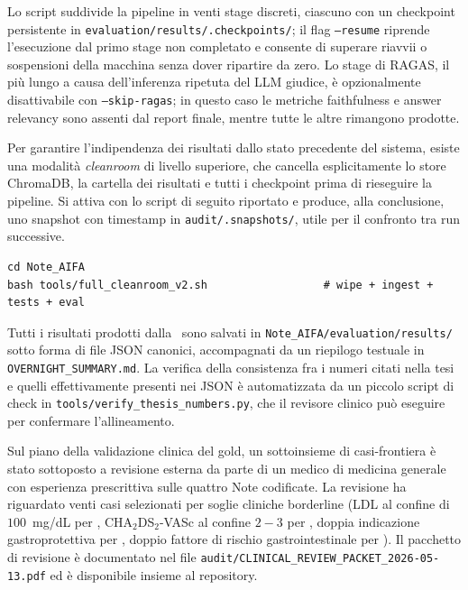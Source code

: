 Lo script suddivide la pipeline in venti stage discreti, ciascuno con un checkpoint persistente in \texttt{evaluation/results/.checkpoints/}; il flag \texttt{--resume} riprende l'esecuzione dal primo stage non completato e consente di superare riavvii o sospensioni della macchina senza dover ripartire da zero. Lo stage di RAGAS, il più lungo a causa dell'inferenza ripetuta del LLM giudice, è opzionalmente disattivabile con \texttt{--skip-ragas}; in questo caso le metriche faithfulness e answer relevancy sono assenti dal report finale, mentre tutte le altre rimangono prodotte.

Per garantire l'indipendenza dei risultati dallo stato precedente del sistema, esiste una modalità \emph{cleanroom} di livello superiore, che cancella esplicitamente lo store ChromaDB, la cartella dei risultati e tutti i checkpoint prima di rieseguire la pipeline. Si attiva con lo script di seguito riportato e produce, alla conclusione, uno snapshot con timestamp in \texttt{audit/.snapshots/}, utile per il confronto tra run successive.

\begin{verbatim}
cd Note_AIFA
bash tools/full_cleanroom_v2.sh                  # wipe + ingest + tests + eval
\end{verbatim}

Tutti i risultati prodotti dalla \cleanroomrun\ sono salvati in \texttt{Note\_AIFA/evaluation/results/} sotto forma di file JSON canonici, accompagnati da un riepilogo testuale in \texttt{OVERNIGHT\_SUMMARY.md}. La verifica della consistenza fra i numeri citati nella tesi e quelli effettivamente presenti nei JSON è automatizzata da un piccolo script di check in \texttt{tools/verify\_thesis\_numbers.py}, che il revisore clinico può eseguire per confermare l'allineamento.

Sul piano della validazione clinica del gold, un sottoinsieme di casi-frontiera è stato sottoposto a revisione esterna da parte di un medico di medicina generale con esperienza prescrittiva sulle quattro Note codificate. La revisione ha riguardato venti casi selezionati per soglie cliniche borderline (LDL al confine di $100$~mg/dL per \notetredici, CHA$_2$DS$_2$-VASc al confine $2{-}3$ per \notenova, doppia indicazione gastroprotettiva per \notezero, doppio fattore di rischio gastrointestinale per \notesessanta). Il pacchetto di revisione è documentato nel file \texttt{audit/CLINICAL\_REVIEW\_PACKET\_2026-05-13.pdf} ed è disponibile insieme al repository.
